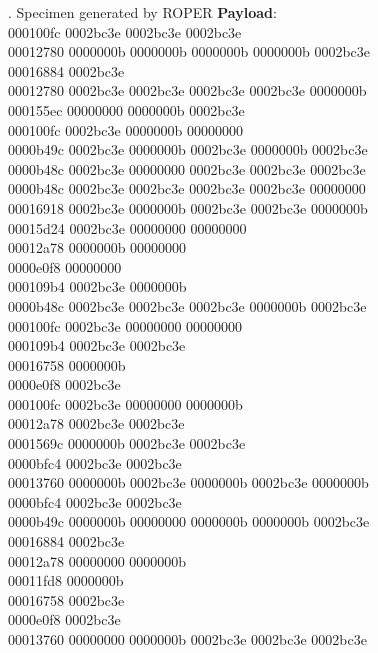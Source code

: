 \documentclass[9pt]{beamer}
\begin{document}
\begin{frame}{\theframenumber. Specimen generated by ROPER}
  \textbf{Payload}:
  \\
  
000100fc 0002bc3e 0002bc3e 0002bc3e \\
00012780 0000000b 0000000b 0000000b 0000000b 0002bc3e \\
00016884 0002bc3e \\
00012780 0002bc3e 0002bc3e 0002bc3e 0002bc3e 0000000b \\
000155ec 00000000 0000000b 0002bc3e \\
000100fc 0002bc3e 0000000b 00000000 \\
0000b49c 0002bc3e 0000000b 0002bc3e 0000000b 0002bc3e \\
0000b48c 0002bc3e 00000000 0002bc3e 0002bc3e 0002bc3e \\
0000b48c 0002bc3e 0002bc3e 0002bc3e 0002bc3e 00000000 \\
00016918 0002bc3e 0000000b 0002bc3e 0002bc3e 0000000b \\
00015d24 0002bc3e 00000000 00000000 \\
00012a78 0000000b 00000000 \\
0000e0f8 00000000 \\
000109b4 0002bc3e 0000000b \\
0000b48c 0002bc3e 0002bc3e 0002bc3e 0000000b 0002bc3e \\
000100fc 0002bc3e 00000000 00000000 \\
000109b4 0002bc3e 0002bc3e \\
00016758 0000000b \\
0000e0f8 0002bc3e \\
000100fc 0002bc3e 00000000 0000000b \\
00012a78 0002bc3e 0002bc3e \\
0001569c 0000000b 0002bc3e 0002bc3e \\
0000bfc4 0002bc3e 0002bc3e \\
00013760 0000000b 0002bc3e 0000000b 0002bc3e 0000000b \\
0000bfc4 0002bc3e 0002bc3e \\
0000b49c 0000000b 00000000 0000000b 0000000b 0002bc3e \\
00016884 0002bc3e \\
00012a78 00000000 0000000b \\
00011fd8 0000000b \\
00016758 0002bc3e \\
0000e0f8 0002bc3e \\
00013760 00000000 0000000b 0002bc3e 0002bc3e 0002bc3e \\

\end{frame}
\end{document}
